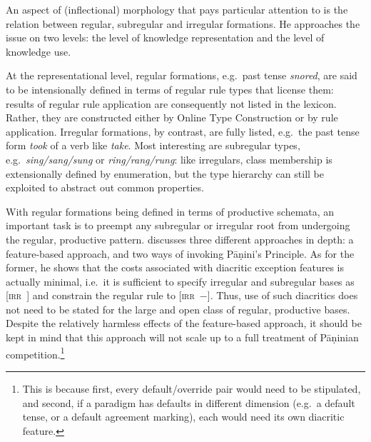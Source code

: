 \documentclass[output=paper
 	        ,biblatex
                ,babelshorthands
                ,newtxmath
                ,draftmode
                ,colorlinks, citecolor=brown
]{langscibook}
\begin{document}
\begin{exe}
\begin{xlist}
An aspect of (inflectional) morphology that \citet{Koenig99} pays
particular attention to is the relation between regular, subregular
and irregular formations. He approaches the issue on two levels: the
level of knowledge representation and the level of knowledge use. 

At the representational level, regular formations, e.g.\ past tense
\textit{snored}, are said to be intensionally defined in terms of
regular rule types that license them: results of regular rule
application are consequently not listed in the lexicon. Rather, they are
constructed either by Online Type Construction or by rule application.
Irregular formations, by contrast, are fully listed, e.g.\ the past
tense form \textit{took} of a verb like \textit{take}. Most
interesting are subregular types, e.g.\ \textit{sing/sang/sung} or
\textit{ring/rang/rung}: like irregulars, class membership is
extensionally defined by enumeration, but the type hierarchy can still
be exploited to abstract out common properties.

With regular formations being defined in terms of productive schemata,
an important task is to preempt any subregular or irregular root from
undergoing the regular, productive pattern. \citet{Koenig99} discusses
three different approaches in depth: a feature-based approach, and two
ways of invoking Pāṇini's Principle. As for the former, he shows that
the costs associated with diacritic exception features is actually
minimal, i.e.\ it is sufficient to specify irregular and subregular
bases as \textsc{[irr~\mathplus{}]} and constrain the regular rule to
\textsc{[irr~$-$]}. Thus, use of such diacritics does not need to be
stated for the large and open class of regular, productive
bases. Despite the relatively harmless effects of the feature-based
approach, it should be kept in mind that this approach will not scale
up to a full treatment of Pāṇinian competition.\footnote{This is
  because first, every default/override pair would need to be
  stipulated, and second, if a paradigm has defaults in different
  dimension (e.g.\ a default tense, or a default agreement marking),
  each would need its own diacritic feature.}


\end{xlist}
\end{exe}
\end{document}
